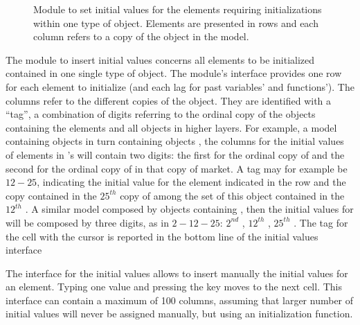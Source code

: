 \documentclass [11pt,a4paper] {book}
\begin{document}
\begin{figure}[ht]
  \centering
  \caption{\small Module to set initial values for the elements requiring initializations within one type of object. Elements are presented in rows and each column refers to a copy of the object in the model.}
  \label{fig:init1}
\end{figure}

The module to insert initial values concerns all elements to be initialized contained in one single type of object. The module's interface provides one row for each element to initialize (and each lag for past variables' and functions'). The columns refer to the different copies of the object. They are identified with a ``tag'', a combination of digits referring to the ordinal copy of the objects containing the elements and all objects in higher layers. For example, a model containing objects  in turn containing objects , the columns for the initial values of elements in 's will contain two digits: the first for the ordinal copy of  and the second for the ordinal copy of  in that copy of market. A tag may for example be $12 - 25$, indicating the initial value for the element indicated in the row and the copy contained in the $25^{th}$ copy of  among the set of this object contained in the $12^{th}$ . A similar model composed by objects  containing , then the initial values for  will be composed by three digits, as in $2 - 12 - 25$: $2^{nd}$ , $12^{th}$ , $25^{th}$ . The tag for the cell with the cursor is reported in the bottom line of the initial values interface

The interface for the initial values allows to insert manually the initial values for an element. Typing one value and pressing the key  moves to the next cell. This interface can contain a maximum of 100 columns, assuming that larger number of initial values will never be assigned manually, but using an initialization function.
\end{document}
